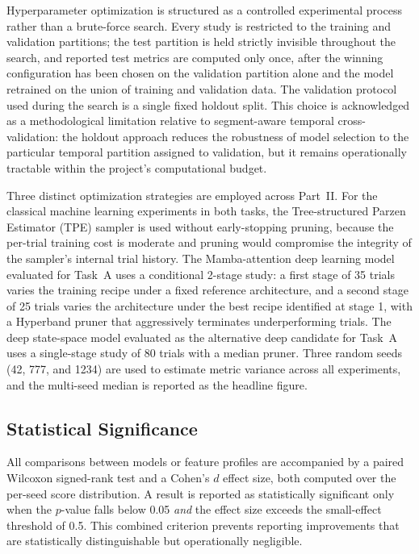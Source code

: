 Hyperparameter optimization is structured as a controlled experimental process rather than a brute-force search. Every study is restricted to the training and validation partitions; the test partition is held strictly invisible throughout the search, and reported test metrics are computed only once, after the winning configuration has been chosen on the validation partition alone and the model retrained on the union of training and validation data. The validation protocol used during the search is a single fixed holdout split. This choice is acknowledged as a methodological limitation relative to segment-aware temporal cross-validation: the holdout approach reduces the robustness of model selection to the particular temporal partition assigned to validation, but it remains operationally tractable within the project's computational budget.

Three distinct optimization strategies are employed across Part~II. For the classical machine learning experiments in both tasks, the Tree-structured Parzen Estimator (TPE) sampler is used without early-stopping pruning, because the per-trial training cost is moderate and pruning would compromise the integrity of the sampler's internal trial history. The Mamba-attention deep learning model evaluated for Task~A uses a conditional 2-stage study: a first stage of 35 trials varies the training recipe under a fixed reference architecture, and a second stage of 25 trials varies the architecture under the best recipe identified at stage 1, with a Hyperband pruner that aggressively terminates underperforming trials. The deep state-space model evaluated as the alternative deep candidate for Task~A uses a single-stage study of 80 trials with a median pruner. Three random seeds (42, 777, and 1234) are used to estimate metric variance across all experiments, and the multi-seed median is reported as the headline figure.

\subsection{Statistical Significance}

All comparisons between models or feature profiles are accompanied by a paired Wilcoxon signed-rank test and a Cohen's $d$ effect size, both computed over the per-seed score distribution. A result is reported as statistically significant only when the $p$-value falls below 0.05 \emph{and} the effect size exceeds the small-effect threshold of 0.5. This combined criterion prevents reporting improvements that are statistically distinguishable but operationally negligible.

